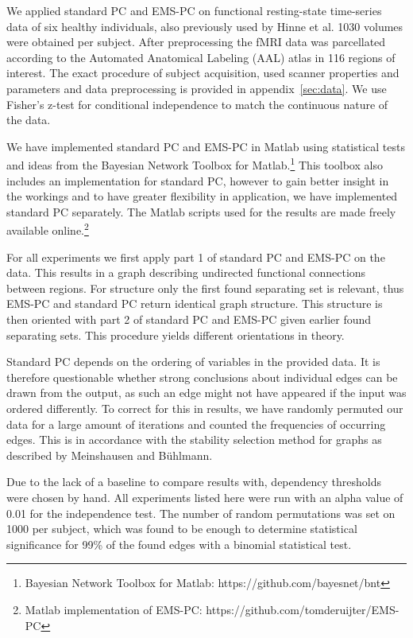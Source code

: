 \documentclass[a4paper, 10pt, english, onecolumn]{article}
\begin{document}
We applied standard PC and EMS-PC on functional resting-state time-series data of six healthy individuals, also previously used by Hinne et al\cite{hinne2013}.
1030 volumes were obtained per subject.
After preprocessing the fMRI data was parcellated according to the Automated Anatomical Labeling (AAL) atlas in 116 regions of interest.
The exact procedure of subject acquisition, used scanner properties and parameters and data preprocessing is provided in appendix~\ref{sec:data}.
We use Fisher's z-test for conditional independence to match the continuous nature of the data.

We have implemented standard PC and EMS-PC in Matlab using statistical tests and ideas from the Bayesian Network Toolbox for Matlab.\footnote{Bayesian Network Toolbox for Matlab: https://github.com/bayesnet/bnt}
This toolbox also includes an implementation for standard PC, however to gain better insight in the workings and to have greater flexibility in application, we have implemented standard PC separately.
The Matlab scripts used for the results are made freely available online.\footnote{Matlab implementation of EMS-PC: https://github.com/tomderuijter/EMS-PC}

For all experiments we first apply part 1 of standard PC and EMS-PC on the data.
This results in a graph describing undirected functional connections between regions.
For structure only the first found separating set is relevant, thus EMS-PC and standard PC return identical graph structure.
This structure is then oriented with part 2 of standard PC and EMS-PC given earlier found separating sets.
This procedure yields different orientations in theory.

Standard PC depends on the ordering of variables in the provided data\cite[p.120-122]{spirtes2000}.
It is therefore questionable whether strong conclusions about individual edges can be drawn from the output, as such an edge might not have appeared if the input was ordered differently.
To correct for this in results, we have randomly permuted our data for a large amount of iterations and counted the frequencies of occurring edges.
This is in accordance with the stability selection method for graphs as described by Meinshausen and B{\"u}hlmann\cite{meinshausen2010}.

Due to the lack of a baseline to compare results with, dependency thresholds were chosen by hand.
All experiments listed here were run with an alpha value of 0.01 for the independence test.
The number of random permutations was set on 1000 per subject, which was found to be enough to determine statistical significance for 99\% of the found edges with a binomial statistical test.
\end{document}
